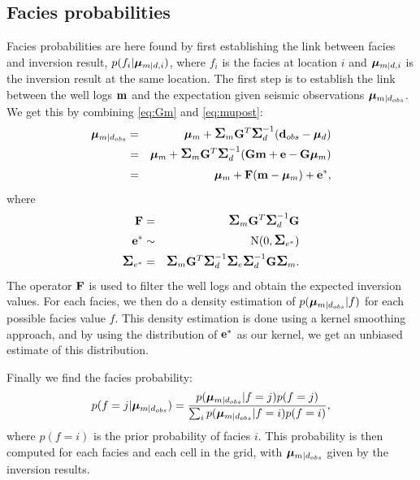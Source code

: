 \subsection{Facies probabilities}
\label{sec:facprobthe}
Facies probabilities are here found by first establishing the link between facies and inversion result, $p(f_i|\bm\mu_{m|d,i})$, where $f_i$ is the facies at location $i$ and $\bm\mu_{m|d,i}$ is the inversion result at the same location. The first step is to establish the link between the well logs $\mathbf{m}$ and the expectation given seismic observations $\bm\mu_{m|d_{obs}}$. We get this by combining \autoref{eq:Gm} and \autoref{eq:mupost}:
\begin{eqnarray}
\bm\mu_{m|d_{obs}} &=&\bm\mu_{m} +\mbox{\large\ensuremath{\boldsymbol{\Sigma}}}_{m}\mathbf{G}^T \mbox{\large\ensuremath{\boldsymbol{\Sigma}}}_{d}^{-1}
                           (\mathbf{d}_{obs}-\bm\mu_{d}) \nonumber \\
& = & \bm\mu_{m} +\mbox{\large\ensuremath{\boldsymbol{\Sigma}}}_{m}\mathbf{G}^T \mbox{\large\ensuremath{\boldsymbol{\Sigma}}}_{d}^{-1}
                           (\mathbf{G}\mathbf{m}+\mathbf{e}-\mathbf{G}\bm\mu_m) \nonumber\\
& = & \bm\mu_m + \mathbf{F}(\mathbf{m}-\bm\mu_m)+\mathbf{e}^*,
\end{eqnarray}
where
\begin{eqnarray}
\mathbf{F} & = &\mbox{\large\ensuremath{\boldsymbol{\Sigma}}}_{m}\mathbf{G}^T \mbox{\large\ensuremath{\boldsymbol{\Sigma}}}_{d}^{-1}\mathbf{G} \\
\mathbf{e}^* & \sim & \text{N}(0,\mbox{\large\ensuremath{\boldsymbol{\Sigma}}}_{e^*}) \\
\mbox{\large\ensuremath{\boldsymbol{\Sigma}}}_{e^*} & = & \mbox{\large\ensuremath{\boldsymbol{\Sigma}}}_{m}\mathbf{G}^T \mbox{\large\ensuremath{\boldsymbol{\Sigma}}}_{d}^{-1}\mbox{\large\ensuremath{\boldsymbol{\Sigma}}}_e\mbox{\large\ensuremath{\boldsymbol{\Sigma}}}_{d}^{-1}\mathbf{G}\mbox{\large\ensuremath{\boldsymbol{\Sigma}}}_m.
\end{eqnarray}
The operator $\mathbf{F}$ is used to filter the well logs and obtain the expected inversion values. For each facies, we then do a density estimation of $p(\bm\mu_{m|d_{obs}}|f)$ for each possible facies value $f$. This density estimation is done using a kernel smoothing approach, and by using the distribution of $\mathbf{e}^*$ as our kernel, we get an unbiased estimate of this distribution.

Finally we find the facies probability:
\begin{equation}
p(f=j|\bm\mu_{m|d_{obs}}) = \frac{p(\bm\mu_{m|d_{obs}}|f=j)p(f=j)}{\sum_i p(\bm\mu_{m|d_{obs}}|f=i)p(f=i)},
\end{equation}
where $p(f=i)$ is the prior probability of facies $i$.
This probability is then computed for each facies and each cell in the grid, with $\bm\mu_{m|d_{obs}}$ given by the inversion results. 

